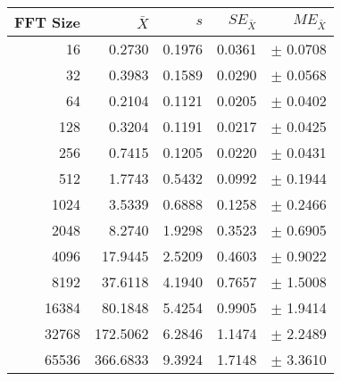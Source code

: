 \begin{tabular}{|r|r|r|r|r|}\hline
    FFT Size & $\bar{X}$ & $s$ & $SE_{\bar{X}}$ & $ME_{\bar{X}}$ \\ \hline
    16 & 0.2730 & 0.1976 & 0.0361 & $\pm$ 0.0708 \\ \hline
    32 & 0.3983 & 0.1589 & 0.0290 & $\pm$ 0.0568 \\ \hline
    64 & 0.2104 & 0.1121 & 0.0205 & $\pm$ 0.0402 \\ \hline
    128 & 0.3204 & 0.1191 & 0.0217 & $\pm$ 0.0425 \\ \hline
    256 & 0.7415 & 0.1205 & 0.0220 & $\pm$ 0.0431 \\ \hline
    512 & 1.7743 & 0.5432 & 0.0992 & $\pm$ 0.1944 \\ \hline
    1024 & 3.5339 & 0.6888 & 0.1258 & $\pm$ 0.2466 \\ \hline
    2048 & 8.2740 & 1.9298 & 0.3523 & $\pm$ 0.6905 \\ \hline
    4096 & 17.9445 & 2.5209 & 0.4603 & $\pm$ 0.9022 \\ \hline
    8192 & 37.6118 & 4.1940 & 0.7657 & $\pm$ 1.5008 \\ \hline
    16384 & 80.1848 & 5.4254 & 0.9905 & $\pm$ 1.9414 \\ \hline
    32768 & 172.5062 & 6.2846 & 1.1474 & $\pm$ 2.2489 \\ \hline
    65536 & 366.6833 & 9.3924 & 1.7148 & $\pm$ 3.3610 \\ \hline
\end{tabular}
